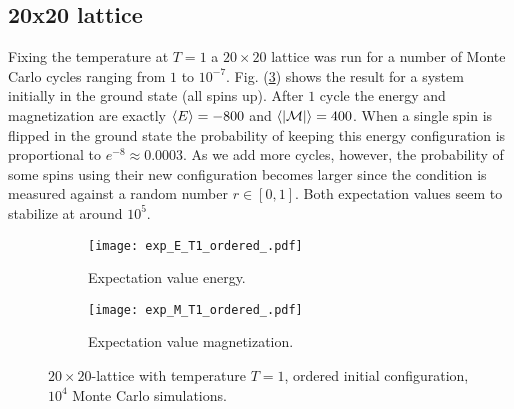 \documentclass[11pt]{article}
\begin{document}
\subsection*{20x20 lattice}

\begin{flushleft}
Fixing the temperature at $T=1$  a $20 \times 20$ lattice was run for a number of Monte Carlo cycles ranging from $1$ to $10^{-7}$. Fig. (\ref{fig:cms-EM T=1}) shows the result for a system initially in the ground state (all spins up). After $1$ cycle the energy and magnetization are exactly $\braket{E}=-800$ and $\braket{|\mathcal{M}|} = 400$. When a single spin is flipped in the ground state the probability of keeping this energy configuration is proportional to $e^{-8} \approx 0.0003$. As we add more cycles, however, the probability of some spins using their new configuration becomes larger since the condition is measured against a random number $r \in [0,1]$. Both expectation values seem to stabilize at around $10^5$.


\begin{figure}[H]
\centering
\begin{subfigure}{.5\textwidth}
  \centering
  \texttt{[image: exp\_E\_T1\_ordered\_.pdf]}
  \caption{Expectation value energy.}
  \label{fig:sub1}
\end{subfigure}%
\begin{subfigure}{.5\textwidth}
  \centering
  \texttt{[image: exp\_M\_T1\_ordered\_.pdf]}
  \caption{Expectation value magnetization.}
  \label{fig:sub2}
\end{subfigure}
\caption{$20 \times 20$-lattice with temperature $T=1$, ordered initial configuration, $10^4$ Monte Carlo simulations.}
\label{fig:cms-EM T=1}
\end{figure}

\end{flushleft}
\end{document}
